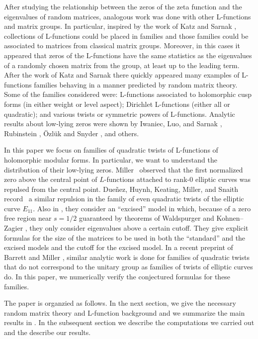 \documentclass[11pt]{amsart}
\begin{document}
After studying the relationship between the zeros of the zeta function and the eigenvalues of random matrices, analogous work was done with other L-functions and matrix groups.  In particular, inspired by the work of Katz and Sarnak \cite{katzsarnak}, collections of L-functions could be placed in families and those families could be associated to matrices from classical matrix groups.  Moreover, in this cases it appeared that zeros of the L-functions have the same statistics as the eigenvalues of a randomly chosen matrix from the group, at least up to the leading term.  After the work of Katz and Sarnak there quickly appeared many examples of L-functions families behaving in a manner predicted by random matrix theory. Some of the families considered were: L-functions associated to holomorphic cusp forms (in either weight or level aspect); Dirichlet L-functions (either all or quadratic); and various twists or symmetric powers of L-functions. Analytic results about low-lying zeros were shown by Iwaniec, Luo, and Sarnak \cite{ils}, Rubinstein , \"Ozl\"uk and Snyder \cite{os}, and others. 

In this paper we focus on families of quadratic twists of L-functions of holomorphic modular forms.  In particular, we want to understand the distribution of their low-lying zeros.  Miller~\cite[Figs. 3 \& 4]{miller06} observed that the first normalized zero above the central point of $L$-functions attached to rank-0 elliptic curves was repulsed from the central point. Due\~nez, Huynh, Keating, Miller, and Snaith record~\cite[Fig. 4]{DHKMS} a similar repulsion in the family of even quadratic twists of the elliptic curve $E_{11}$.  Also in \cite{DHKMS}, they consider an ``excised'' model in which, because of a zero free region near $s=1/2$ guaranteed by theorems of Waldspurger \cite{Waldspurger} and Kohnen--Zagier \cite{KZ}, they only consider eigenvalues above a certain cutoff.  They give explicit formulas for the size of the matrices to be used in both the ``standard'' and the excised models and the cutoff for the excised model.  In a recent preprint of Barrett and Miller \cite{bm}, similar analytic work is done for families of quadratic twists that do not correspond to the unitary group as families of twists of elliptic curves do.  In this paper, we numerically verify the conjectured formulas for these families.

The paper is organzied as follows.  In the next section, we give the necessary random matrix theory and L-function background and we summarize the main results in \cite{bm}.  In the subsequent section we describe the computations we carried out and the describe our results.
\end{document}

